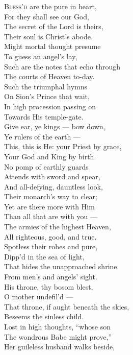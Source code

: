 \textsc{Bless’d} are the pure in heart, \\
 For they shall see our God, \\
 The secret of the Lord is theirs, \\
 Their soul is Christ’s abode. \\
  Might mortal thought presume \\
 To guess an angel’s lay, \\
 Such are the notes that echo through \\
 The courts of Heaven to-day. \\
  Such the triumphal hymns \\
 On Sion’s Prince that wait, \\
 In high procession passing on \\
 Towards His temple-gate. \\
  Give ear, ye kings — bow down, \\
 Ye rulers of the earth — \\
 This, this is He: your Priest by grace, \\
 Your God and King by birth. \\
  No pomp of earthly guards \\
 Attends with sword and spear, \\
 And all-defying, dauntless look, \\
 Their monarch’s way to clear; \\
  Yet are there more with Him \\
 Than all that are with you — \\
 The armies of the highest Heaven, \\
 All righteous, good, and true. \\
  Spotless their robes and pure, \\
 Dipp’d in the sea of light, \\
 That hides the unapproached shrine \\
 From men’s and angels’ sight. \\
  His throne, thy bosom blest, \\
 O mother undefil’d — \\
 That throne, if aught beneath the skies, \\
 Beseems the sinless child. \\
  Lost in high thoughts, “whose son \\
 The wondrous Babe might prove,” \\
 Her guileless husband walks beside, \\

